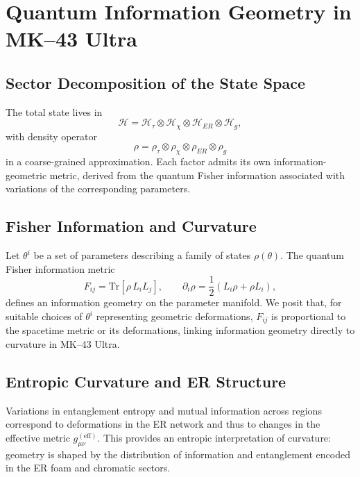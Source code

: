 \chapter{Quantum Information Geometry in MK--43 Ultra}

\section{Sector Decomposition of the State Space}

The total state lives in
\[
  \mathcal{H} = \mathcal{H}_\tau \otimes \mathcal{H}_\chi \otimes \mathcal{H}_{ER} \otimes \mathcal{H}_g,
\]
with density operator
\[
  \rho = \rho_\tau \otimes \rho_\chi \otimes \rho_{ER} \otimes \rho_g
\]
in a coarse-grained approximation.
Each factor admits its own information-geometric metric, derived from the quantum Fisher information associated with variations of the corresponding parameters.

\section{Fisher Information and Curvature}

Let $\theta^i$ be a set of parameters describing a family of states $\rho(\theta)$.
The quantum Fisher information metric
\[
  F_{ij} = \mathrm{Tr}\left[\rho\, L_i L_j\right], \qquad \partial_i \rho = \frac{1}{2}\left(L_i\rho + \rho L_i\right),
\]
defines an information geometry on the parameter manifold.
We posit that, for suitable choices of $\theta^i$ representing geometric deformations, $F_{ij}$ is proportional to the spacetime metric or its deformations, linking information geometry directly to curvature in MK--43 Ultra.

\section{Entropic Curvature and ER Structure}

Variations in entanglement entropy and mutual information across regions correspond to deformations in the ER network and thus to changes in the effective metric $g_{\mu\nu}^{\mathrm{(eff)}}$.
This provides an entropic interpretation of curvature:
geometry is shaped by the distribution of information and entanglement encoded in the ER foam and chromatic sectors.

